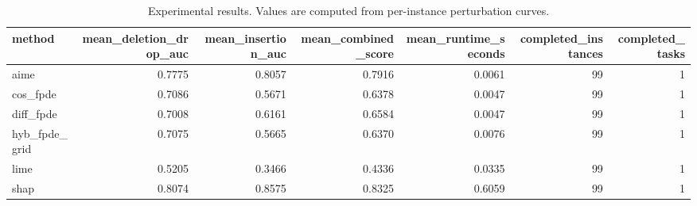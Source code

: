 \begin{table}[t]
\caption{Experimental results. Values are computed from per-instance perturbation curves.}
\label{tab:main_results_computed}
\centering
\begin{tabular}{lrrrrrr}
\toprule
method & mean\_deletion\_drop\_auc & mean\_insertion\_auc & mean\_combined\_score & mean\_runtime\_seconds & completed\_instances & completed\_tasks \\
\midrule
aime & 0.7775 & 0.8057 & 0.7916 & 0.0061 & 99 & 1 \\
cos\_fpde & 0.7086 & 0.5671 & 0.6378 & 0.0047 & 99 & 1 \\
diff\_fpde & 0.7008 & 0.6161 & 0.6584 & 0.0047 & 99 & 1 \\
hyb\_fpde\_grid & 0.7075 & 0.5665 & 0.6370 & 0.0076 & 99 & 1 \\
lime & 0.5205 & 0.3466 & 0.4336 & 0.0335 & 99 & 1 \\
shap & 0.8074 & 0.8575 & 0.8325 & 0.6059 & 99 & 1 \\
\bottomrule
\end{tabular}

\end{table}
